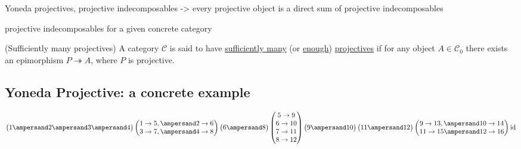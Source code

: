 Yoneda projectives, projective indecomposables -> every projective object is a direct sum of projective indecomposables

projective indecomposables for a given concrete category

\begin{definition}{(Sufficiently many projectives)}\label{def:enough_projectives}
A category $\mathcal{C}$ is said to have \ul{sufficiently many} (or \ul{enough}) \ul{projectives} if for any object $A \in \mathcal{C}_{0}$
there exists an epimorphism $P \twoheadrightarrow A$, where $P$ is projective.
\end{definition}





\subsection{Yoneda Projective: a concrete example}

\[
\begin{pmatrix}1 \ampersand 2 \ampersand 3 \ampersand 4\end{pmatrix}
\begin{pmatrix} 1\to5, \ampersand 2\to6 \\ 3\to7, \ampersand 4\to8 \end{pmatrix}
\begin{pmatrix}6 \ampersand 8\end{pmatrix}
\begin{pmatrix}5\to9\\6\to10\\7\to11\\8\to12\end{pmatrix}
\begin{pmatrix}9\ampersand10\end{pmatrix}\begin{pmatrix}11\ampersand12\end{pmatrix}
\begin{pmatrix}9\to13, \ampersand 10\to14\\11\to15 \ampersand 12\to16\end{pmatrix}
\textup{id}
\]



